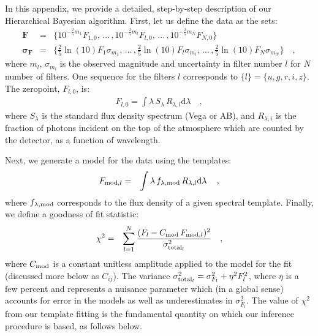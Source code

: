 \documentclass[12pt,preprint]{aastex}
\newcommand{\datavector}[1]{\boldsymbol{#1}}
\newcommand{\flux}{\datavector{F}}
\newcommand{\uncertainty}{\datavector{\sigma_F}}
\newcommand{\dd}{\mathrm{d}}
\begin{document}
In this appendix, we provide a detailed, step-by-step description of our Hierarchical 
Bayesian algorithm.  First, let us define the data as the sets:
\footnotesize
\begin{eqnarray}\displaystyle
\flux & = & \{10^{-\frac{2}{5}m_1}F_{1,0},\,...\,,10^{-\frac{2}{5}m_l}F_{l,0},\,...\,,10^{-\frac{2}{5}m_N}F_{N,0}\}
\nonumber\\
\uncertainty & = & \{\frac{2}{5}\ln(10)F_1\sigma_{m_1},\,...\,,\frac{2}{5}\ln(10)F_l\sigma_{m_l},\,...\,,\frac{2}{5}\ln(10)F_N\sigma_{m_N}\}
\quad ,
\end{eqnarray}
\normalsize
\noindent where $m_l$, $\sigma_{m_l}$ is the observed magnitude and 
uncertainty in filter number $l$ for $N$ number of filters.  One  
sequence for the filters $l$ corresponds to $\{l\}=\{u,g,r,i,z\}$. The 
zeropoint, $F_{l,0}$, is:
\begin{eqnarray}\displaystyle
F_{l,0}=\int \lambda \,S_\lambda\,R_{\lambda, l} \dd \lambda
\quad ,
\end{eqnarray}
where $S_\lambda$ is the standard flux density spectrum (Vega or AB), and 
$R_{\lambda,i}$ is the fraction of photons incident on the top 
of the atmosphere which are counted by the detector, as a function 
of wavelength.

Next, we generate a model for the data using the templates:
\begin{eqnarray}\displaystyle
F_{{\rm mod},l} & = & \int  \lambda\,f_{\lambda,{\rm mod}}\,R_{\lambda,l} \dd \lambda\,
\quad ,
\end{eqnarray}
where $f_{\lambda,{\rm mod}}$ corresponds to the flux density 
of a given spectral template.  Finally, we define a goodness of 
fit statistic:
\begin{eqnarray}\displaystyle\label{eqn:chi}
\chi^2 & = & \sum\limits_{l=1}^N \frac{(F_l-C_{\rm mod}\,F_{{\rm mod},l})^2}{\sigma_{{\rm total}_l}^2}
\quad ,
\end{eqnarray}
where $C_{\rm mod}$ is a constant unitless amplitude applied to the 
model for the fit (discussed more below as $C_{ij}$).  The variance 
$\sigma_{{\rm total}_l}^2 = \sigma_{F_l}^2 + \eta^2 F_{l}^2$, where $\eta$ is 
a few percent and represents a nuisance parameter which (in a global sense) accounts for 
error in the models as well as underestimates in $ \sigma_{F_l}^2 $.  The 
value of $\chi^2$ from our template fitting is the fundamental quantity 
on which our inference procedure is based, as follows below.
\end{document}

